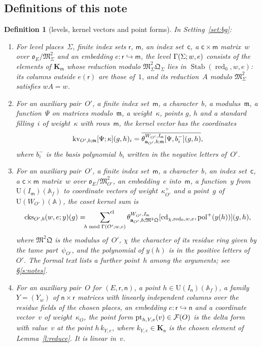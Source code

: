\documentclass[11pt,a4paper]{article}
\newcommand{\kw}[1]{\emph{#1}}
\newcommand{\m}[1]{\mbox{$#1$}}        %
\theoremstyle{plainx}
\theoremstyle{uprightx}
\newtheorem{definition}[theorem]{Definition}
\newcommand{\AAA}{\mathbb{A}}
\newcommand{\ix}[1]{\mathsf{#1}}
\newcommand{\OEr}{\mathfrak{o}_E}
\newcommand{\UU}{\mathrm{U}}
\newcommand{\KK}[1]{\mathbf{K}_{#1}}
\newcommand{\clsum}[2]{\sideset{}{^{\mathrm{cl}}}\sum_{#1\bmod #2}}
\newcommand{\tk}[7]{\theta^{#1,#2}_{#3,#4;#5}[#6,#7]}
\newcommand{\FormVx}[1]{\mathcal{F}(#1)}
\newcommand{\cks}[5]{\operatorname{cks}_{#1,#2}(#3,#4;#5)}
\newcommand{\lpl}{\Sigma}              %
\begin{document}
\subsection*{Definitions of this note}
\begin{definition}[levels, kernel vectors and point forms]\label{d:point}
In Setting~\ref{set:bg}:
\begin{enumerate}[label=\textup{(\roman*)},leftmargin=2.3em,itemsep=2pt]
\item For level places~$\lpl$, finite index sets \m{\ix r}, \m{\ix m}, an index set~\m{\ix c}, a \m{\ix c\times\ix m}
matrix~$w$ over \m{\OEr/\mathfrak{M}_\lpl^{2}} and an embedding \m{e\colon\ix r\hookrightarrow\ix m}, the level
\m{\rowFixingLevel{\lpl}{w}{e}} consists of the elements of \m{\KK{\ix m}} whose reduction modulo
\m{\mathfrak{M}_\lpl^{2}\mathfrak{Q}_\lpl} lies in \m{\operatorname{Stab}(\operatorname{red}_0,w,e)}: its columns outside
\m{e(\ix r)} are those of~$1$, and its reduction~$A$ modulo \m{\mathfrak{M}_\lpl^{2}} satisfies \m{wA=w}.
\item For an auxiliary pair~$O'$, a finite index set~$\ix m$, a character~$b$, a modulus~$\mathfrak{m}$, a
function~$\Psi$ on matrices modulo~$\mathfrak{m}$, a weight~$\kappa$, points $g$, $h$ and a standard filling~$i$ of
weight~$\kappa$ with rows~$\ix m$, the \kw{kernel vector} has the coordinates
\[\kernelVector{O'}{b}{\mathfrak{m}}{\Psi}{\kappa}{g}{h}{i}=\overline{\tk{W_{O'}}{I_{\ix m}}{\mathbf{a}_{O'}}{b}{\mathfrak{m}}{\Psi}{b_i^{-}}(g,h)},\]
where \m{b_i^{-}} is the basis polynomial~$b_i$ written in the negative letters of~$O'$.
\item For an auxiliary pair~$O'$, a finite index set~$\ix m$, a character~$b$, an index set~$\ix c$, a
\m{\ix c\times\ix m} matrix~$w$ over \m{\OEr/\mathfrak{M}_{O'}^{2}}, an embedding~$e$ into~$\ix m$, a function~$y$ from
\m{\UU(I_{\ix m})(\AAA_f)} to coordinate vectors of weight~$\kappa^{+}_{O'}$ and a point~$g$ of
\m{\UU(W_{O'})(\AAA)}, the \kw{coset kernel sum} is
\[\cks{O'}{b}{w}{e}{y}(g)=\clsum{h}{\rowFixingLevel{O'}{w}{e}}\tk{W_{O'}}{I_{\ix m}}{\mathbf{a}_{O'}}{b}{\mathfrak{M}^{2}\mathfrak{Q}}{\operatorname{cd}_{\chi,\operatorname{red}_0,w,e}}{\operatorname{pol}^{+}(y(h))}(g,h),\]
where \m{\mathfrak{M}^{2}\mathfrak{Q}} is the modulus of~$O'$, $\chi$ the character of its residue ring given by the
tame part~$\psi_{O'}$, and the polynomial of \m{y(h)} is in the positive letters of~$O'$. The formal text lists a
further point~$h$ among the arguments; see §\ref{s:notes}.
\item For an auxiliary pair~$O$ for \m{(E,\ix r,\ix n)}, a point \m{h\in\UU(I_{\ix n})(\AAA_f)}, a family \m{Y=(Y_w)}
of \m{\ix n\times\ix r} matrices with linearly independent columns over the residue fields of the chosen places, an
embedding \m{e\colon\ix r\hookrightarrow\ix n} and a coordinate vector~$v$ of weight~$\kappa_O$, the \kw{point form}
\m{\pointForm{h}{Y}{e}{v}\in\FormVx{O}} is the delta form with value~$v$ at the point \m{h\,k_{Y,e}}, where
\m{k_{Y,e}\in\KK{\ix n}} is the chosen element of Lemma~\ref{l:reduce}. It is linear in~$v$.
\end{enumerate}
\end{definition}
\end{document}
